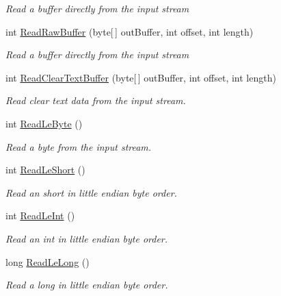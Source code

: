 \begin{DoxyCompactItemize}
\begin{DoxyCompactList}\small\item\em Read a buffer directly from the input stream \end{DoxyCompactList}\item 
int \hyperlink{class_i_c_sharp_code_1_1_sharp_zip_lib_1_1_zip_1_1_compression_1_1_streams_1_1_inflater_input_buffer_ab1d5dd38c12a4aa85b5ab4711d9db38e}{Read\+Raw\+Buffer} (byte\mbox{[}$\,$\mbox{]} out\+Buffer, int offset, int length)
\begin{DoxyCompactList}\small\item\em Read a buffer directly from the input stream \end{DoxyCompactList}\item 
int \hyperlink{class_i_c_sharp_code_1_1_sharp_zip_lib_1_1_zip_1_1_compression_1_1_streams_1_1_inflater_input_buffer_aa41364f1e657de58b5a3ea4bba8a1785}{Read\+Clear\+Text\+Buffer} (byte\mbox{[}$\,$\mbox{]} out\+Buffer, int offset, int length)
\begin{DoxyCompactList}\small\item\em Read clear text data from the input stream. \end{DoxyCompactList}\item 
int \hyperlink{class_i_c_sharp_code_1_1_sharp_zip_lib_1_1_zip_1_1_compression_1_1_streams_1_1_inflater_input_buffer_a654b6527602ee7e40701ff2b6e06f7d1}{Read\+Le\+Byte} ()
\begin{DoxyCompactList}\small\item\em Read a byte from the input stream. \end{DoxyCompactList}\item 
int \hyperlink{class_i_c_sharp_code_1_1_sharp_zip_lib_1_1_zip_1_1_compression_1_1_streams_1_1_inflater_input_buffer_ad32fda3dc02d4bc2b74e86085b56e5fa}{Read\+Le\+Short} ()
\begin{DoxyCompactList}\small\item\em Read an short in little endian byte order. \end{DoxyCompactList}\item 
int \hyperlink{class_i_c_sharp_code_1_1_sharp_zip_lib_1_1_zip_1_1_compression_1_1_streams_1_1_inflater_input_buffer_a1d65153877d19d09c94ca9d410c9fcf3}{Read\+Le\+Int} ()
\begin{DoxyCompactList}\small\item\em Read an int in little endian byte order. \end{DoxyCompactList}\item 
long \hyperlink{class_i_c_sharp_code_1_1_sharp_zip_lib_1_1_zip_1_1_compression_1_1_streams_1_1_inflater_input_buffer_ab992d08820caa0b4330dbef0c66f4df5}{Read\+Le\+Long} ()
\begin{DoxyCompactList}\small\item\em Read a long in little endian byte order. \end{DoxyCompactList}\end{DoxyCompactItemize}
